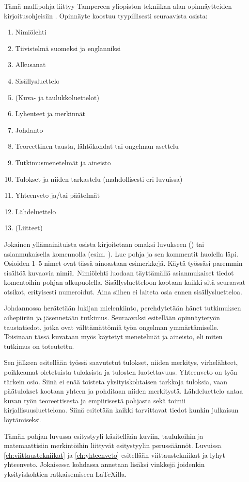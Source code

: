 Tämä mallipohja liittyy Tampereen yliopiston tekniikan alan opinnäytteiden kirjoitusohjeisiin \parencite{kirjoitusohje2018}. Opinnäyte koostuu tyypillisesti seuraavista osista:

\begin{enumerate}
    \item[] Nimiölehti
    \item[] Tiivistelmä suomeksi ja englanniksi
    \item[] Alkusanat
    \item[] Sisällysluettelo
    \item[] (Kuva- ja taulukkoluettelot)
    \item[] Lyhenteet ja merkinnät
    \item Johdanto
    \item Teoreettinen tausta, lähtökohdat tai ongelman asettelu
    \item Tutkimusmenetelmät ja aineisto
    \item Tulokset ja niiden tarkastelu (mahdollisesti eri luvuissa)
    \item Yhteenveto ja/tai päätelmät
    \item[] Lähdeluettelo
    \item[] (Liitteet)
\end{enumerate}

Jokainen yllämainituista osista kirjoitetaan omaksi luvukseen () tai asianmukaisella komennolla (esim. ). Lue pohja ja sen kommentit huolella läpi. Osioiden 1--5 nimet ovat tässä ainoastaan esimerkkejä. Käytä työssäsi paremmin sisältöä kuvaavia nimiä. Nimiölehti luodaan täyttämällä asianmukaiset tiedot komentoihin pohjan alkupuolella. Sisällysluetteloon kootaan kaikki sitä seuraavat otsikot, erityisesti numeroidut. Aina siihen ei laiteta osia ennen sisällysluetteloa.

Johdannossa herätetään lukijan mielenkiinto, perehdytetään hänet tutkimuksen aihepiiriin ja jäsennetään tutkimus. Seuraavaksi esitellään opinnäytetyön taustatiedot, jotka ovat välttämättömiä työn ongelman ymmärtämiselle. Toisinaan tässä kuvataan myös käytetyt menetelmät ja aineisto, eli miten tutkimus on toteutettu.

Sen jälkeen esitellään työssä saavutetut tulokset, niiden merkitys, virhelähteet, poikkeamat oletetuista tuloksista ja tulosten luotettavuus. Yhteenveto on työn tärkein osio. Siinä ei enää toisteta yksityiskohtaisen tarkkoja tuloksia, vaan päätulokset kootaan yhteen ja pohditaan niiden merkitystä. Lähdeluettelo antaa kuvan työn teoreettisesta ja empiirisestä pohjasta sekä toimii kirjallisuusluettelona. Siinä esitetään kaikki tarvittavat tiedot kunkin julkaisun löytämiseksi.

Tämän pohjan luvussa esitystyyli käsitellään kuviin, taulukoihin ja matemaattisiin merkintöihin liittyvät esitystyylin perussäännöt. Luvuissa \ref{ch:viittaustekniikat} ja \ref{ch:yhteenveto} esitellään viittaustekniikat ja lyhyt yhteenveto. Jokaisessa kohdassa annetaan lisäksi vinkkejä joidenkin yksityiskohtien ratkaisemiseen \LaTeX{}illa.
